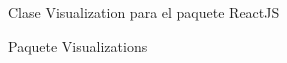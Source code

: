 {\begin{minipage}{\linewidth}
  \begin{figure}[H]
    \caption{Clase Visualization para el paquete ReactJS}
  \end{figure}
\end{minipage}}



\begin{figure}[H]
  \caption{Paquete Visualizations}
\end{figure}

